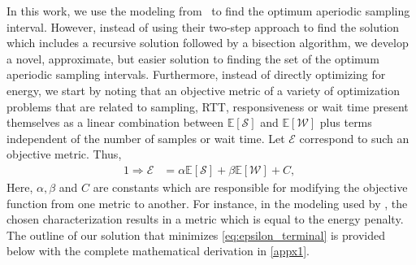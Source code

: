 In this work, we use the modeling from~\cite{secAperiodic} to find the optimum aperiodic sampling interval.
However, instead of using their two-step approach to find the solution which includes a recursive solution followed by a bisection algorithm, we develop a novel, approximate, but easier solution to finding the set of the optimum aperiodic sampling intervals.
Furthermore, instead of directly optimizing for energy, we start by noting that an objective metric of a variety of optimization problems that are related to sampling, RTT, responsiveness or wait time present themselves 
as a linear combination between $\mathbb{E}[\mathcal{S}]$ and $\mathbb{E}[\mathcal{W}]$ plus terms independent of the number of samples or wait time.
Let $\mathcal{E}$ correspond to such an objective metric.
Thus,
\begin{alignat}{1}
    \Rightarrow\mathcal{E}&=\alpha\mathbb{E}[\mathcal{S}]+\beta\mathbb{E}[\mathcal{W}]+C,\;\label{eq:epsilon_terminal}
\end{alignat}
Here, $\alpha, \beta$ and $C$ are constants which are responsible for modifying the objective function from one metric to another.
For instance, in the modeling used by \textcite{ICCperiodic1,TMCperiodic,secAperiodic}, the chosen characterization results in a metric which is equal to the energy penalty.
The outline of our solution that minimizes \cref{eq:epsilon_terminal} is provided below with the complete mathematical derivation in \cref{appx1}.

\bigskip

